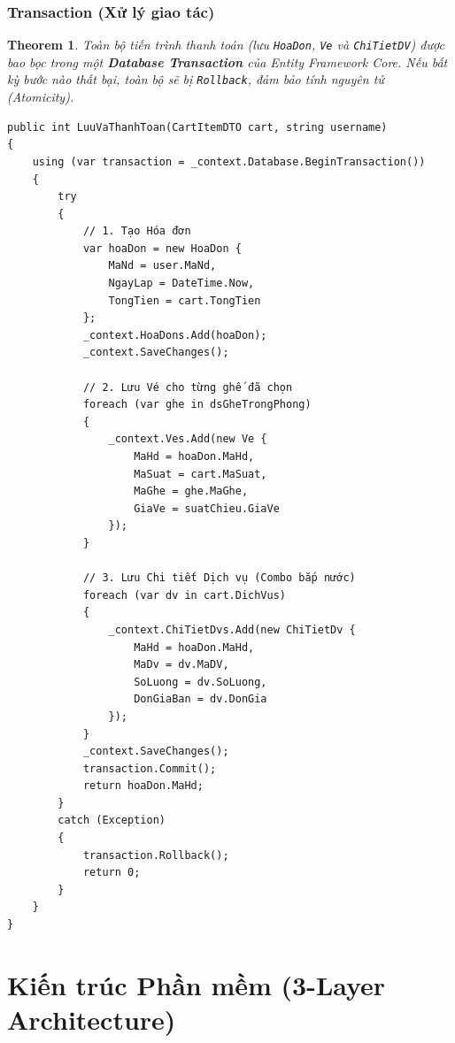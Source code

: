 \documentclass[12pt,a4paper,oneside]{book}
\theoremstyle{plain}
\newtheorem{thm}{Theorem}[chapter]
\numberwithin{equation}{chapter}
\begin{document}
\subsection{Transaction (Xử lý giao tác)}

\begin{thm}\label{thm_transaction}
    Toàn bộ tiến trình thanh toán (lưu \texttt{HoaDon}, \texttt{Ve} và \texttt{ChiTietDV}) được bao bọc trong một \textbf{Database Transaction} của Entity Framework Core. Nếu bất kỳ bước nào thất bại, toàn bộ sẽ bị \texttt{Rollback}, đảm bảo tính nguyên tử (Atomicity).
\end{thm}

\begin{lstlisting}[style=csharpstyle, caption={Transaction trong \texttt{HoaDonBUS.LuuVaThanhToan()}}]
public int LuuVaThanhToan(CartItemDTO cart, string username)
{
    using (var transaction = _context.Database.BeginTransaction())
    {
        try
        {
            // 1. Tạo Hóa đơn
            var hoaDon = new HoaDon {
                MaNd = user.MaNd,
                NgayLap = DateTime.Now,
                TongTien = cart.TongTien
            };
            _context.HoaDons.Add(hoaDon);
            _context.SaveChanges();
            
            // 2. Lưu Vé cho từng ghế đã chọn
            foreach (var ghe in dsGheTrongPhong)
            {
                _context.Ves.Add(new Ve {
                    MaHd = hoaDon.MaHd,
                    MaSuat = cart.MaSuat,
                    MaGhe = ghe.MaGhe,
                    GiaVe = suatChieu.GiaVe
                });
            }
            
            // 3. Lưu Chi tiết Dịch vụ (Combo bắp nước)
            foreach (var dv in cart.DichVus)
            {
                _context.ChiTietDvs.Add(new ChiTietDv {
                    MaHd = hoaDon.MaHd,
                    MaDv = dv.MaDV,
                    SoLuong = dv.SoLuong,
                    DonGiaBan = dv.DonGia
                });
            }
            _context.SaveChanges();
            transaction.Commit();   
            return hoaDon.MaHd;
        }
        catch (Exception)
        {
            transaction.Rollback(); 
            return 0;
        }
    }
}
\end{lstlisting}

\chapter{Kiến trúc Phần mềm (3-Layer Architecture)}
\end{document}
